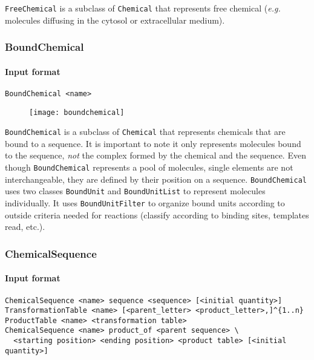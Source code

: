 \texttt{FreeChemical} is a subclass of \texttt{Chemical} that represents free chemical (\textit{e.g.} molecules diffusing in the cytosol or extracellular medium).

\subsubsection{BoundChemical}

\paragraph{Input format}
\begin{verbatim}
BoundChemical <name>
\end{verbatim}

\begin{figure}[!ht]
	\centering
	\texttt{[image: boundchemical]}
\end{figure}

\texttt{BoundChemical} is a subclass of \texttt{Chemical} that represents chemicals that are bound to a sequence. It is important to note it only represents molecules bound to the sequence, \emph{not} the complex formed by the chemical and the sequence. Even though \texttt{BoundChemical} represents a pool of molecules, single elements are not interchangeable, they are defined by their position on a sequence. \texttt{BoundChemical} uses two classes \texttt{BoundUnit} and \texttt{BoundUnitList} to represent molecules individually. It uses \texttt{BoundUnitFilter} to organize bound units according to outside criteria needed for reactions (classify according to binding sites, templates read, etc.).

\subsubsection{ChemicalSequence}

\paragraph{Input format}
\begin{verbatim}
ChemicalSequence <name> sequence <sequence> [<initial quantity>]
TransformationTable <name> [<parent_letter> <product_letter>,]^{1..n}
ProductTable <name> <transformation table>
ChemicalSequence <name> product_of <parent sequence> \
  <starting position> <ending position> <product table> [<initial quantity>]
\end{verbatim}

